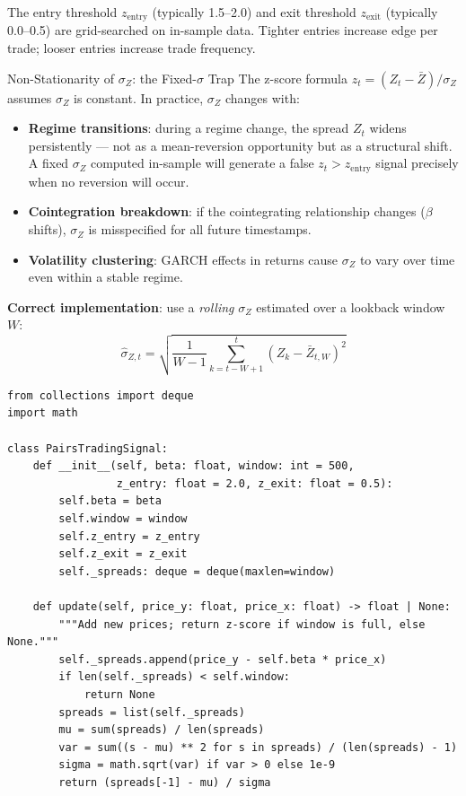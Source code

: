 \documentclass[12pt,a4paper,openany]{report}
\theoremstyle{definition}
\begin{document}
The entry threshold $z_{\text{entry}}$ (typically 1.5–2.0) and exit threshold $z_{\text{exit}}$ (typically 0.0–0.5) are grid-searched on in-sample data. Tighter entries increase edge per trade; looser entries increase trade frequency.

\begin{warningbox}{Non-Stationarity of $\sigma_Z$: the Fixed-$\sigma$ Trap}
The z-score formula $z_t = (Z_t - \bar{Z})/\sigma_Z$ assumes $\sigma_Z$ is constant. In practice, $\sigma_Z$ changes with:
\begin{itemize}
  \item \textbf{Regime transitions}: during a regime change, the spread $Z_t$ widens persistently — not as a mean-reversion opportunity but as a structural shift. A fixed $\sigma_Z$ computed in-sample will generate a false $z_t > z_{\text{entry}}$ signal precisely when no reversion will occur.
  \item \textbf{Cointegration breakdown}: if the cointegrating relationship changes ($\beta$ shifts), $\sigma_Z$ is misspecified for all future timestamps.
  \item \textbf{Volatility clustering}: GARCH effects in returns cause $\sigma_Z$ to vary over time even within a stable regime.
\end{itemize}

\textbf{Correct implementation}: use a \emph{rolling} $\sigma_Z$ estimated over a lookback window $W$:
\[
  \hat{\sigma}_{Z,t} = \sqrt{\frac{1}{W-1}\sum_{k=t-W+1}^{t}(Z_k - \bar{Z}_{t,W})^2}
\]
\begin{lstlisting}[caption={Rolling z-score for pairs trading}]
from collections import deque
import math

class PairsTradingSignal:
    def __init__(self, beta: float, window: int = 500,
                 z_entry: float = 2.0, z_exit: float = 0.5):
        self.beta = beta
        self.window = window
        self.z_entry = z_entry
        self.z_exit = z_exit
        self._spreads: deque = deque(maxlen=window)

    def update(self, price_y: float, price_x: float) -> float | None:
        """Add new prices; return z-score if window is full, else None."""
        self._spreads.append(price_y - self.beta * price_x)
        if len(self._spreads) < self.window:
            return None
        spreads = list(self._spreads)
        mu = sum(spreads) / len(spreads)
        var = sum((s - mu) ** 2 for s in spreads) / (len(spreads) - 1)
        sigma = math.sqrt(var) if var > 0 else 1e-9
        return (spreads[-1] - mu) / sigma


\end{lstlisting}
\end{warningbox}
\end{document}
